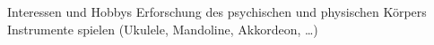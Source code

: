 \begin{rubric}{\textcolor{black!20!blue!100}{Interessen und Hobbys}}%
	\entry*
		Erforschung des psychischen und physischen Körpers
	\entry*
		Instrumente spielen (Ukulele, Mandoline, Akkordeon, \ldots)
\end{rubric}